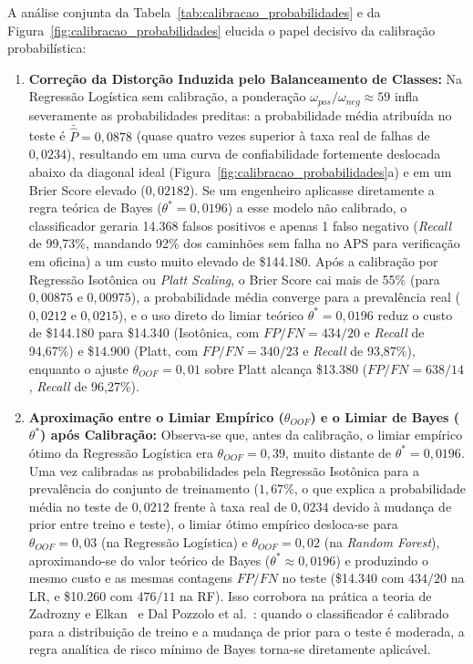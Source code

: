 \documentclass[conference]{IEEEtran}
\begin{document}
A análise conjunta da Tabela~\ref{tab:calibracao_probabilidades} e da Figura~\ref{fig:calibracao_probabilidades} elucida o papel decisivo da calibração probabilística:
\begin{enumerate}
    \item \textbf{Correção da Distorção Induzida pelo Balanceamento de Classes:} Na Regressão Logística sem calibração, a ponderação $\omega_{pos}/\omega_{neg} \approx 59$ infla severamente as probabilidades preditas: a probabilidade média atribuída no teste é $\bar{\hat{P}} = 0{,}0878$ (quase quatro vezes superior à taxa real de falhas de $0{,}0234$), resultando em uma curva de confiabilidade fortemente deslocada abaixo da diagonal ideal (Figura~\ref{fig:calibracao_probabilidades}a) e em um Brier Score elevado ($0{,}02182$). Se um engenheiro aplicasse diretamente a regra teórica de Bayes ($\theta^* = 0{,}0196$) a esse modelo não calibrado, o classificador geraria 14.368 falsos positivos e apenas 1 falso negativo (\textit{Recall} de 99,73\%, mandando 92\% dos caminhões sem falha no APS para verificação em oficina) a um custo muito elevado de \$144.180. Após a calibração por Regressão Isotônica ou \textit{Platt Scaling}, o Brier Score cai mais de 55\% (para $0{,}00875$ e $0{,}00975$), a probabilidade média converge para a prevalência real ($0{,}0212$ e $0{,}0215$), e o uso direto do limiar teórico $\theta^* = 0{,}0196$ reduz o custo de \$144.180 para \$14.340 (Isotônica, com $FP/FN = 434/20$ e \textit{Recall} de 94,67\%) e \$14.900 (Platt, com $FP/FN = 340/23$ e \textit{Recall} de 93,87\%), enquanto o ajuste $\theta_{OOF} = 0{,}01$ sobre Platt alcança \$13.380 ($FP/FN = 638/14$, \textit{Recall} de 96,27\%).
    \item \textbf{Aproximação entre o Limiar Empírico ($\theta_{OOF}$) e o Limiar de Bayes ($\theta^*$) após Calibração:} Observa-se que, antes da calibração, o limiar empírico ótimo da Regressão Logística era $\theta_{OOF} = 0{,}39$, muito distante de $\theta^* = 0{,}0196$. Uma vez calibradas as probabilidades pela Regressão Isotônica para a prevalência do conjunto de treinamento ($1{,}67\%$, o que explica a probabilidade média no teste de $0{,}0212$ frente à taxa real de $0{,}0234$ devido à mudança de prior entre treino e teste), o limiar ótimo empírico desloca-se para $\theta_{OOF} = 0{,}03$ (na Regressão Logística) e $\theta_{OOF} = 0{,}02$ (na \textit{Random Forest}), aproximando-se do valor teórico de Bayes ($\theta^* \approx 0{,}0196$) e produzindo o mesmo custo e as mesmas contagens $FP/FN$ no teste (\$14.340 com $434/20$ na LR, e \$10.260 com $476/11$ na RF). Isso corrobora na prática a teoria de Zadrozny e Elkan~\cite{zadrozny2002transforming} e Dal Pozzolo et al.~\cite{dalpozzolo2015calibrating}: quando o classificador é calibrado para a distribuição de treino e a mudança de prior para o teste é moderada, a regra analítica de risco mínimo de Bayes torna-se diretamente aplicável.

\end{enumerate}
\end{document}
